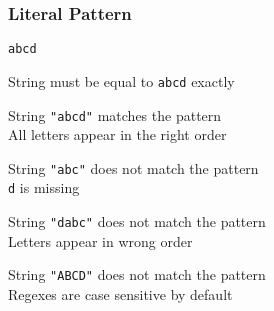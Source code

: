 \begin{frame}
  \frametitle{Literal Pattern}
  \begin{center}
    \texttt{abcd}
  \end{center}
  \begin{center}
    String must be equal to \texttt{abcd} exactly
  \end{center}
  \begin{overprint}
    \begin{center}
      String \texttt{"abcd"} matches the pattern \\[2mm]
      All letters appear in the right order
    \end{center}

    \begin{center}
      String \texttt{"abc"} does not match the pattern \\[2mm]
      \texttt{d} is missing
    \end{center}

    \begin{center}
      String \texttt{"dabc"} does not match the pattern \\[2mm]
      Letters appear in wrong order
    \end{center}

    \begin{center}
      String \texttt{"ABCD"} does not match the pattern \\[2mm]
      Regexes are case sensitive by default
    \end{center}
  \end{overprint}

\end{frame}

